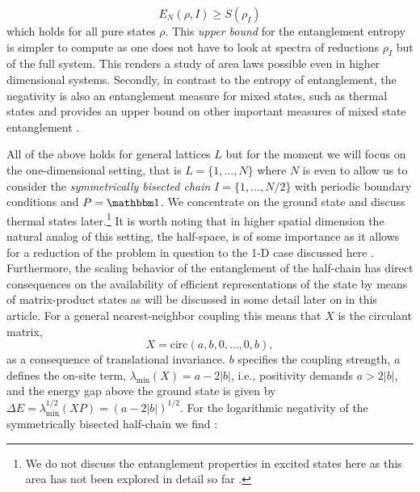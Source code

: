 \documentclass[rmp,twocolumn,floatfix,epsfig,graphics]{revtex4} %
\begin{document}
\begin{equation}
        E_{N}(\rho,I) \geq S(\rho_I)\label{logengineq}
\end{equation}
which holds for all pure states $\rho$. This {\it upper bound} 
for the entanglement entropy is simpler to compute as one does 
not have to look at spectra of reductions $\rho_I$ but of the 
full system. This renders a study of area laws possible even in 
higher dimensional systems. Secondly, in contrast to the entropy
of entanglement, the negativity is also an entanglement measure 
for mixed states, such as thermal states and provides an upper
bound on other important measures of mixed state entanglement \cite{VedralP98,Bennett,ChristandlW04,InHouseReview}.

All of the above holds for general lattices $L$ but for the moment 
we will focus on the one-dimensional setting, that is 
$L=\{1,\dots, N\}$ where $N$ is even to allow us to consider 
the {\it symmetrically bisected chain} $I=\{1,\dots, N/2\}$ with 
periodic boundary conditions and $P=\id$. We concentrate on
the ground state and discuss thermal states
 later.\footnote{We do not discuss the entanglement
properties in excited states here as this area has not been 
explored in detail so far \cite{Excited,Buzek04}.} It is worth noting
that in higher spatial dimension the natural analog of this
setting, the half-space, is of some importance as it allows 
for a reduction of the problem in question to the 1-D case 
discussed here \cite{Halfspace}. Furthermore, the scaling 
behavior of the entanglement of the half-chain has 
direct consequences on the availability of efficient 
representations of the state by means of matrix-product states
as will be discussed in some detail later on in this article.
For a general nearest-neighbor 
coupling this means that $X$ is the circulant matrix, 
\begin{equation}\label{HC}
        X=\text{circ}(a,b,0,\dots, 0,b),
\end{equation}
as a consequence of translational invariance. $b$ 
specifies the coupling strength, $a$ defines the on-site
term, $\lambda_{\text{min}}(X)=a-2|b|$, i.e., positivity
demands $a>2|b|$, and the energy gap above the ground state
is given by  $\Delta E = \lambda^{1/2}_{\text{min}}(XP ) = 
(a-2|b|)^{1/2}$. For the logarithmic negativity of the 
symmetrically bisected half-chain we find \cite{Harmonic}:
\end{document}

